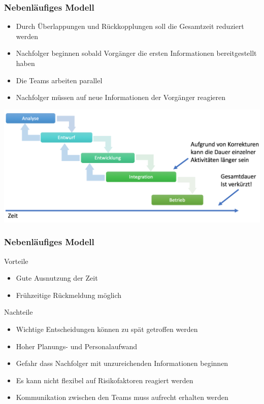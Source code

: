 \begin{frame}
\frametitle{Nebenläufiges Modell}
	\begin{itemize}
		\item Durch Überlappungen und Rückkopplungen 
		soll die Gesamtzeit reduziert werden
		\item Nachfolger beginnen sobald Vorgänger die ersten
		Informationen bereitgestellt haben
		\item Die Teams arbeiten parallel
		\item Nachfolger müssen auf neue Informationen der Vorgänger reagieren
	\end{itemize}
	\center\includegraphics[width=1\textwidth,
		keepaspectratio=true]{bilder/nebenlaufiges_model.png}
\end{frame}

\begin{frame}
\frametitle{Nebenläufiges Modell}
	Vorteile
	\begin{itemize}
		\item Gute Ausnutzung der Zeit
		\item Frühzeitige Rückmeldung möglich
	\end{itemize}
	\bigskip
	Nachteile
	\begin{itemize}
		\item Wichtige Entscheidungen können zu spät getroffen werden
		\item Hoher Planungs- und Personalaufwand
		\item Gefahr dass Nachfolger mit unzureichenden Informationen beginnen 
		\item Es kann nicht flexibel auf Risikofaktoren reagiert werden
		\item Kommunikation zwischen den Teams muss aufrecht erhalten werden
	\end{itemize}
\end{frame}

